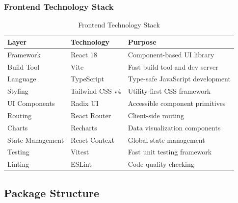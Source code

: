 \subsubsection{Frontend Technology Stack}
\begin{table}[H]
\centering
\small
\renewcommand{\arraystretch}{1.3}
\begin{tabularx}{\textwidth}{|l|l|>{\RaggedRight\arraybackslash}X|}
\hline
\textbf{Layer} & \textbf{Technology} & \textbf{Purpose} \\
\hline
Framework & React 18 & Component-based UI library \\
\hline
Build Tool & Vite & Fast build tool and dev server \\
\hline
Language & TypeScript & Type-safe JavaScript development \\
\hline
Styling & Tailwind CSS v4 & Utility-first CSS framework \\
\hline
UI Components & Radix UI & Accessible component primitives \\
\hline
Routing & React Router & Client-side routing \\
\hline
Charts & Recharts & Data visualization components \\
\hline
State Management & React Context & Global state management \\
\hline
Testing & Vitest & Fast unit testing framework \\
\hline
Linting & ESLint & Code quality checking \\
\hline
\end{tabularx}
\caption{Frontend Technology Stack}
\label{tab:frontend-stack}
\end{table}

\subsection{Package Structure}

